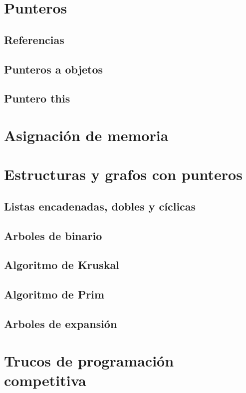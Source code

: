 \documentclass{article}
\begin{document}
\section{Punteros}

\subsection{Referencias}

\subsection{Punteros a objetos}

\subsection{Puntero this}

\section{Asignación de memoria}

\section{Estructuras y grafos con punteros}

\subsection{Listas encadenadas, dobles y cíclicas}

\subsection{Arboles de binario}

\subsection{Algoritmo de Kruskal}

\subsection{Algoritmo de Prim}

\subsection{Arboles de expansión}

\section{Trucos de programación competitiva}
\end{document}
